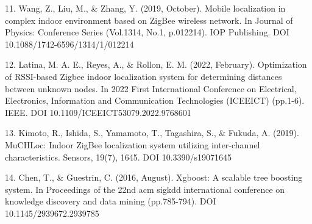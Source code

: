 \begin{references}
11. Wang, Z., Liu, M., \& Zhang, Y. (2019, October). Mobile localization
in complex indoor environment based on ZigBee wireless network. In
Journal of Physics: Conference Series (Vol.1314, No.1, p.012214). IOP
Publishing. DOI 10.1088/1742-6596/1314/1/012214

12. Latina, M. A. E., Reyes, A., \& Rollon, E. M. (2022, February).
Optimization of RSSI-based Zigbee indoor localization system for
determining distances between unknown nodes. In 2022 First International
Conference on Electrical, Electronics, Information and Communication
Technologies (ICEEICT) (pp.1-6). IEEE. DOI
10.1109/ICEEICT53079.2022.9768601

13. Kimoto, R., Ishida, S., Yamamoto, T., Tagashira, S., \& Fukuda, A.
(2019). MuCHLoc: Indoor ZigBee localization system utilizing
inter-channel characteristics. Sensors, 19(7), 1645. DOI
10.3390/s19071645

14. Chen, T., \& Guestrin, C. (2016, August). Xgboost: A scalable tree
boosting system. In Proceedings of the 22nd acm sigkdd international
conference on knowledge discovery and data mining (pp.785-794). DOI
10.1145/2939672.2939785
\end{references}

